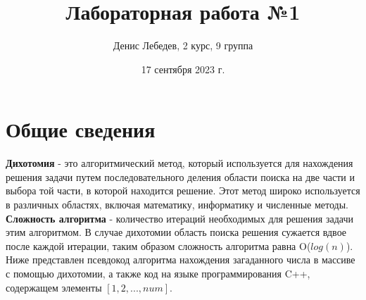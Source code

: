 \documentclass{article}
\title{Лабораторная работа №1}
\author{Денис Лебедев, 2 курс, 9 группа}
\date{17 сентября 2023 г.}
\begin{document}
    \maketitle
    \section{Общие сведения}
        \hspace*{1cm}\textbf{Дихотомия} - это алгоритмический метод, который используется для нахождения решения задачи путем последовательного деления области поиска на две части и выбора той части, в которой находится решение. Этот метод широко используется в различных областях, включая математику, информатику и численные методы.
        \hspace*{1cm}\textbf{Сложность алгоритма} - количество итераций необходимых для решения задачи этим алгоритмом. В случае дихотомии область поиска решения сужается вдвое после каждой итерации, таким образом сложность алгоритма равна O($log(n)$).
        \hspace*{1cm}Ниже представлен псевдокод алгоритма нахождения загаданного числа в массиве с помощью дихотомии, а также код на языке программирования C++, содержащем элементы $[1, 2,..., num]$.
\end{document}
